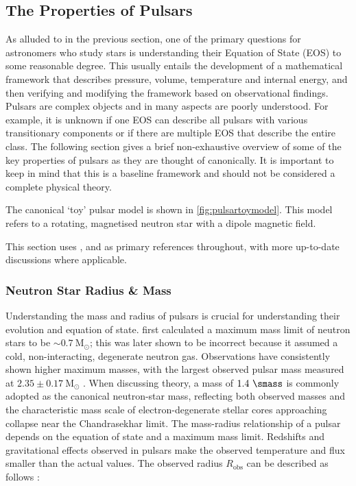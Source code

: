 \subsection{The Properties of Pulsars} \label{sec:properties_of_pulsars}

As alluded to in the previous section, one of the primary questions for astronomers who study stars is understanding their Equation of State (EOS) to some reasonable degree. This usually entails the development of a mathematical framework that describes pressure, volume, temperature and internal energy, and then verifying and modifying the framework based on observational findings. Pulsars are complex objects and in many aspects are poorly understood. For example, it is unknown if one EOS can describe all pulsars with various transitionary components or if there are multiple EOS that describe the entire class. The following section gives a brief non-exhaustive overview of some of the key properties of pulsars as they are thought of canonically. It is important to keep in mind that this is a baseline framework and should not be considered a complete physical theory. 

The canonical `toy' pulsar model is shown in \cref{fig:pulsartoymodel}. This model refers to a rotating, magnetised neutron star with a dipole magnetic field. 

This section uses \cite{pulsar_handbook}, \cite{EssenRadio16} and \cite{1983bhwd.book.....S} as primary references throughout, with more up-to-date discussions where applicable.  


\subsubsection{Neutron Star Radius \& Mass}

Understanding the mass and radius of pulsars is crucial for understanding their evolution and equation of state. \cite{oppenheimer_massive_1939} first calculated a maximum mass limit of neutron stars to be $ \sim 0.7~\mathrm {M_{\odot}} $; this was later shown to be incorrect because it assumed a cold, non-interacting, degenerate neutron gas. Observations have consistently shown higher maximum masses, with the largest observed pulsar mass measured at $2.35 \pm 0.17 ~\mathrm{M_{\odot}}$ \citep{Romani_2022}. When discussing theory, a mass of $1.4~\smass$ is commonly adopted as the canonical neutron-star mass, reflecting both observed masses and the characteristic mass scale of electron-degenerate stellar cores approaching collapse near the Chandrasekhar limit. The mass-radius relationship of a pulsar depends on the equation of state and a maximum mass limit. Redshifts and gravitational effects observed in pulsars make the observed temperature and flux smaller than the actual values. The observed radius $R_\text{obs}$ can be described as follows \citep[p. 56][]{pulsar_handbook}:

